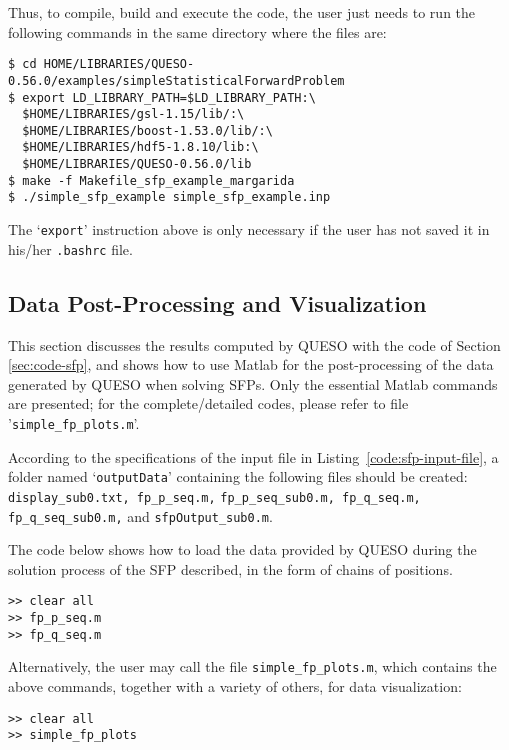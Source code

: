 Thus, to compile, build and execute the code, the user just needs to run the following commands in the same directory where the files are:
\begin{lstlisting}
$ cd HOME/LIBRARIES/QUESO-0.56.0/examples/simpleStatisticalForwardProblem
$ export LD_LIBRARY_PATH=$LD_LIBRARY_PATH:\
  $HOME/LIBRARIES/gsl-1.15/lib/:\
  $HOME/LIBRARIES/boost-1.53.0/lib/:\
  $HOME/LIBRARIES/hdf5-1.8.10/lib:\
  $HOME/LIBRARIES/QUESO-0.56.0/lib
$ make -f Makefile_sfp_example_margarida
$ ./simple_sfp_example simple_sfp_example.inp
\end{lstlisting}

The `\verb+export+' instruction above is only necessary if the user has not saved it in his/her \verb+.bashrc+ file.


\subsection{Data Post-Processing and Visualization}\label{sec:sfp-results}

This section discusses the results computed by QUESO with the code of Section \ref{sec:code-sfp}, and shows how to use Matlab for the post-processing of the data generated by QUESO when solving SFPs. Only the essential Matlab commands are presented; for the complete/detailed codes, please refer to file '\verb+simple_fp_plots.m+'.

According to the specifications of the input file in Listing~\ref{code:sfp-input-file}, a folder named `\verb+outputData+' containing the following files should be created: \verb+display_sub0.txt, fp_p_seq.m,+ \linebreak \verb+fp_p_seq_sub0.m, fp_q_seq.m, fp_q_seq_sub0.m,+ and \verb+sfpOutput_sub0.m+.

The code below shows how to load the data provided by QUESO during the solution
process of the SFP described, in the form of chains of positions.
\begin{lstlisting}[caption={Matlab code for loading the data in both parameter and QoI chains of the SFP.}]
% inside Matlab
>> clear all
>> fp_p_seq.m
>> fp_q_seq.m
\end{lstlisting}


Alternatively, the user may call the file \texttt{simple\_fp\_plots.m}, which
contains the above commands, together with a variety of others, for data
visualization:
\begin{lstlisting}[caption={Matlab code for loading the data in both parameter and QoI chains of the SFP, by calling the file \texttt{simple\_fp\_plots.m}.}]
% inside Matlab
>> clear all
>> simple_fp_plots
\end{lstlisting}




